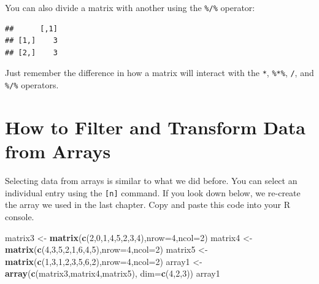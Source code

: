 \documentclass[
]{book}
\newenvironment{Shaded}{\begin{snugshade}}{\end{snugshade}}
\newcommand{\DataTypeTok}[1]{\textcolor[rgb]{0.13,0.29,0.53}{#1}}
\newcommand{\DecValTok}[1]{\textcolor[rgb]{0.00,0.00,0.81}{#1}}
\newcommand{\KeywordTok}[1]{\textcolor[rgb]{0.13,0.29,0.53}{\textbf{#1}}}
\newcommand{\NormalTok}[1]{#1}
\newcommand{\OperatorTok}[1]{\textcolor[rgb]{0.81,0.36,0.00}{\textbf{#1}}}
\newcommand{\StringTok}[1]{\textcolor[rgb]{0.31,0.60,0.02}{#1}}
\begin{document}
You can also divide a matrix with another using the \texttt{\%/\%} operator:

\begin{Shaded}
\end{Shaded}

\begin{verbatim}
##      [,1]
## [1,]    3
## [2,]    3
\end{verbatim}

Just remember the difference in how a matrix will interact with the \texttt{*}, \texttt{\%*\%}, \texttt{/}, and \texttt{\%/\%} operators.

\hypertarget{how-to-filter-and-transform-data-from-arrays}{%
\section{How to Filter and Transform Data from Arrays}\label{how-to-filter-and-transform-data-from-arrays}}

Selecting data from arrays is similar to what we did before. You can select an individual entry using the \texttt{{[}n{]}} command. If you look down below, we re-create the array we used in the last chapter. Copy and paste this code into your R console.

\begin{Shaded}
\begin{Highlighting}[]
\NormalTok{matrix3 <-}\StringTok{ }\KeywordTok{matrix}\NormalTok{(}\KeywordTok{c}\NormalTok{(}\DecValTok{2}\NormalTok{,}\DecValTok{0}\NormalTok{,}\DecValTok{1}\NormalTok{,}\DecValTok{4}\NormalTok{,}\DecValTok{5}\NormalTok{,}\DecValTok{2}\NormalTok{,}\DecValTok{3}\NormalTok{,}\DecValTok{4}\NormalTok{),}\DataTypeTok{nrow=}\DecValTok{4}\NormalTok{,}\DataTypeTok{ncol=}\DecValTok{2}\NormalTok{)}
\NormalTok{matrix4 <-}\StringTok{ }\KeywordTok{matrix}\NormalTok{(}\KeywordTok{c}\NormalTok{(}\DecValTok{4}\NormalTok{,}\DecValTok{3}\NormalTok{,}\DecValTok{5}\NormalTok{,}\DecValTok{2}\NormalTok{,}\DecValTok{1}\NormalTok{,}\DecValTok{6}\NormalTok{,}\DecValTok{4}\NormalTok{,}\DecValTok{5}\NormalTok{),}\DataTypeTok{nrow=}\DecValTok{4}\NormalTok{,}\DataTypeTok{ncol=}\DecValTok{2}\NormalTok{)}
\NormalTok{matrix5 <-}\StringTok{ }\KeywordTok{matrix}\NormalTok{(}\KeywordTok{c}\NormalTok{(}\DecValTok{1}\NormalTok{,}\DecValTok{3}\NormalTok{,}\DecValTok{1}\NormalTok{,}\DecValTok{2}\NormalTok{,}\DecValTok{3}\NormalTok{,}\DecValTok{5}\NormalTok{,}\DecValTok{6}\NormalTok{,}\DecValTok{2}\NormalTok{),}\DataTypeTok{nrow=}\DecValTok{4}\NormalTok{,}\DataTypeTok{ncol=}\DecValTok{2}\NormalTok{)}
\NormalTok{array1 <-}\StringTok{ }\KeywordTok{array}\NormalTok{(}\KeywordTok{c}\NormalTok{(matrix3,matrix4,matrix5),}
                \DataTypeTok{dim=}\KeywordTok{c}\NormalTok{(}\DecValTok{4}\NormalTok{,}\DecValTok{2}\NormalTok{,}\DecValTok{3}\NormalTok{))  }
\NormalTok{array1}
\end{Highlighting}
\end{Shaded}
\end{document}

